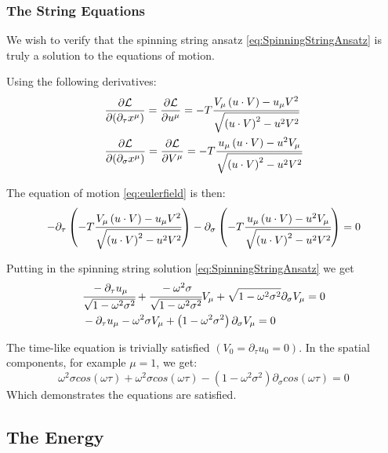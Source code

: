 \documentclass[11pt,a4paper]{article}
\begin{document}
\FloatBarrier
\subsubsection{The String Equations}
 
We wish to verify that the spinning string ansatz \ref{eq:SpinningStringAnsatz} is truly a solution to the equations of motion.

Using the following derivatives:
\begin{align*}
&\frac{\partial\mathcal{L}}{\partial(\partial_{\tau}x^{\mu})}=\frac{\partial\mathcal{L}}{\partial u^{\mu}}=-T\cfrac{V_{\mu}\left(u\cdot V\right)-u_{\mu}V^{2}}{\sqrt{\left(u\cdot V\right)^{2}-u^{2}V^{2}}}\\
&\frac{\partial\mathcal{L}}{\partial(\partial_{\sigma}x^{\mu})}=\frac{\partial\mathcal{L}}{\partial V^{\mu}}=-T\cfrac{u_{\mu}\left(u\cdot V\right)-u^{2}V_{\mu}}{\sqrt{\left(u\cdot V\right)^{2}-u^{2}V^{2}}}
\end{align*} 

The equation of motion \ref{eq:eulerfield} is then:
\begin{equation*}
-\partial_{\tau}\left(-T\cfrac{V_{\mu}\left(u\cdot V\right)-u_{\mu}V^{2}}{\sqrt{\left(u\cdot V\right)^{2}-u^{2}V^{2}}}\right)-\partial_{\sigma}\left(-T\cfrac{u_{\mu}\left(u\cdot V\right)-u^{2}V_{\mu}}{\sqrt{\left(u\cdot V\right)^{2}-u^{2}V^{2}}}\right)=0
\end{equation*}

Putting in the spinning string solution \ref{eq:SpinningStringAnsatz} we get
\begin{align*}
&\cfrac{-\partial_{\tau}u_{\mu}}{\sqrt{1-\omega^{2}\sigma^{2}}}+\cfrac{-\omega^{2}\sigma}{\sqrt{1-\omega^{2}\sigma^{2}}}V_{\mu}+\sqrt{1-\omega^{2}\sigma^{2}}\partial_{\sigma}V_{\mu}=0\\
&-\partial_{\tau}u_{\mu}-\omega^{2}\sigma V_{\mu}+\left(1-\omega^{2}\sigma^{2}\right)\partial_{\sigma}V_{\mu}=0
\end{align*} 

The time-like equation is trivially satisfied $\left(V_{0}=\partial_{\tau}u_{0}=0\right)$. In the spatial components, for example $\mu=1$, we get:
\begin{equation*}
\omega^{2}\sigma cos\left(\omega\tau\right)
+\omega^{2}\sigma cos\left(\omega\tau\right)
-\left(1-\omega^{2}\sigma^{2}\right)\partial_{\sigma}cos\left(\omega\tau\right)=0
\end{equation*}
Which demonstrates the equations are satisfied.
\FloatBarrier
 \subsection{The Energy}
 
\end{document}
